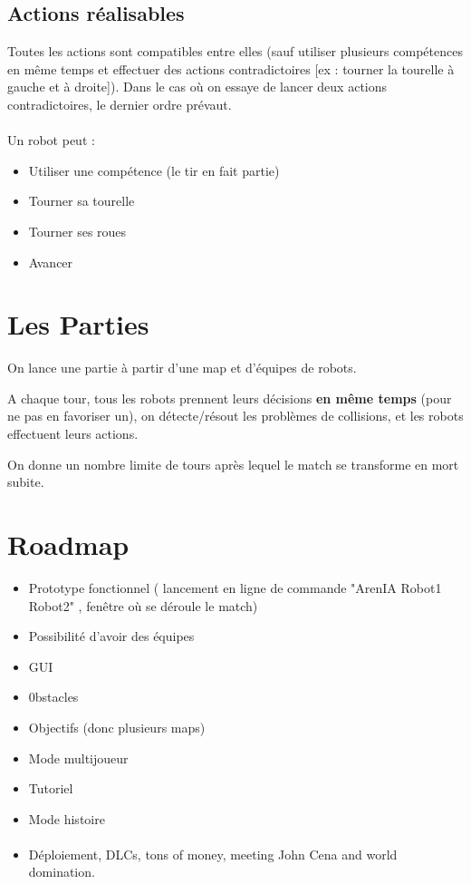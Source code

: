 \documentclass[10pt]{article}
\begin{document}
\subsection{Actions réalisables}

Toutes les actions sont compatibles entre elles (sauf utiliser plusieurs compétences en même temps et effectuer des actions contradictoires [ex : tourner la tourelle à gauche et à droite]). Dans le cas où on essaye de lancer deux actions contradictoires, le dernier ordre prévaut.

\paragraph{}
Un robot peut :

\begin{itemize}
\item Utiliser une compétence (le tir en fait partie)
\item Tourner sa tourelle
\item Tourner ses roues
\item Avancer
\end{itemize}



\newpage

\section{Les Parties}

On lance une partie à partir d'une map et d'équipes de robots.

A chaque tour, tous les robots prennent leurs décisions \textbf{en même temps} (pour ne pas en favoriser un), on détecte/résout les problèmes de collisions, et les robots effectuent leurs actions.

On donne un nombre limite de tours après lequel le match se transforme en mort subite.



\section{Roadmap}

\begin{itemize}
\item Prototype fonctionnel ( lancement en ligne de commande "ArenIA Robot1 Robot2" , fenêtre où se déroule le match)
\item Possibilité d'avoir des équipes
\item GUI
\item 0bstacles
\item Objectifs (donc plusieurs maps)
\item Mode multijoueur
\item Tutoriel
\item Mode histoire
\paragraph{}
\item Déploiement, DLCs, tons of money, meeting John Cena and world domination.
\end{itemize}
\end{document}
